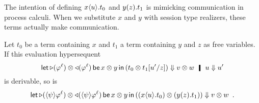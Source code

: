       The intention of defining ${x}\langle{u}\rangle.{t_0}$ and ${{y}({z}).{t_1}}$
      is mimicking communication in process calculi.
      When we substitute $x$ and $y$ with session type realizers,
      these terms actually make communication.
       \begin{theorem}
	Let $t_0$ be a term containing $x$ and $t_1$ a term containing
	$y$ and $z$ as free variables.
	If this evaluation hypersequent
	\[
	\letin {\leftside{\phi^\ell}\otimes \rightside{\phi^\ell}}
	{x\otimes y}{(t_0\otimes t_1[u'/z])}\eval v\otimes w\hmid u\eval u'
	\]
	is derivable, so is
	\[
	 \mathsf{let }\,{\mathop\triangleright(\langle{\psi}\rangle{\varphi^\ell})\otimes
	\mathop\triangleleft(\langle{\psi}\rangle{\varphi^\ell})}\,\mathsf{ be }\,{x\otimes y}\,\mathsf{ in }\,{
	\left(({x}\langle{u}\rangle.{t_0})\otimes ({{y}({z}).{t_1}})\right)}
	\Downarrow v\otimes w
	\enspace .
	\]
       \end{theorem}
